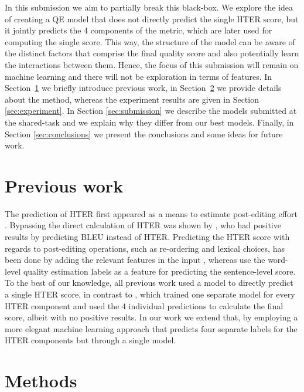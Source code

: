 \documentclass[11pt,letterpaper]{article}
\begin{document}
In this submission we aim to partially break this black-box. We explore the idea
of creating a QE model that does not directly predict the single HTER score, but
it jointly predicts the 4 components of the metric, which are later used for
computing the single score. This way, the structure of the model can be aware of
the distinct factors that comprise the final quality score and also potentially
learn the interactions between them. Hence, the focus of this submission will
remain on machine learning and there will not be exploration in terms of
features. In Section~\ref{sec:previous} we briefly introduce previous work, in
Section~\ref{sec:methods} we provide details about the method, whereas the
experiment results are given in Section \ref{sec:experiment}. In Section
\ref{sec:submission} we describe the models submitted at the shared-task and we
explain why they differ from our best models. Finally, in Section
\ref{sec:conclusions} we present the conclusions and some ideas for future work.


\section{Previous work}
\label{sec:previous}

The prediction of HTER first appeared as a means to estimate post-editing effort
\cite{Specia2010}. Bypassing the direct calculation of HTER was shown by
\citet{kozlova-shmatova-frolov:2016:WMT}, who had positive results by predicting
BLEU instead of HTER.
Predicting the HTER score with regards to post-editing operations, such as
re-ordering and lexical choices, has been done by adding the relevant features
in the input \cite{sagemo-stymne:2016:WMT}, whereas \citet{tezcan-EtAl:2015:WMT}
use the word-level quality estimation labels as a feature for predicting the
sentence-level score. To the best of our knowledge, all previous work used a
model to directly predict a single HTER score, in contrast to
\citet{avramidis:2014:W14-33}, which trained one separate model for every HTER
component and used the 4 individual predictions to calculate the final score,
albeit with no positive results. In our work we extend that, by employing a more
elegant machine learning approach that predicts four separate labels for the
HTER components but through a single model.


\section{Methods}
\label{sec:methods}
\end{document}
